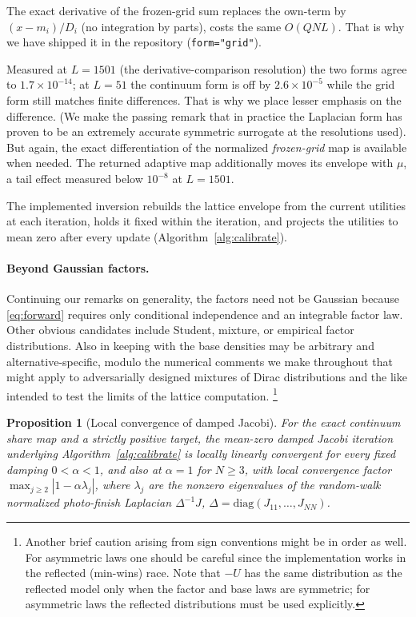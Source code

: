 \documentclass[12pt]{article}
\newtheorem{proposition}{Proposition}
\theoremstyle{remark}
\begin{document}
The exact derivative of the frozen-grid sum replaces the own-term by $(x - m_i)/D_i$ (no
integration by parts), costs the same $O(QNL)$. That is why we have shipped it in the repository
(\texttt{form="grid"}).

Measured at $L = 1501$ (the derivative-comparison resolution) the
two forms agree to $1.7\times10^{-14}$; at $L = 51$ the continuum form is
off by $2.6\times10^{-5}$ while the grid form still matches finite
differences. That is why we place lesser emphasis on the difference. (We make the passing remark
that in practice the Laplacian form has proven to be
 an extremely accurate symmetric surrogate at the
resolutions used). But again, the exact differentiation of the normalized
\emph{frozen-grid} map is available when needed.  The returned adaptive map
additionally moves its envelope with $\mu$, a tail effect measured below
$10^{-8}$ at $L = 1501$.

The implemented inversion rebuilds the lattice envelope from the current
utilities at each iteration, holds it fixed within the iteration, and
projects the utilities to mean zero after every update
(Algorithm~\ref{alg:calibrate}).

\paragraph{Beyond Gaussian factors.} Continuing our remarks on generality, the factors need not be Gaussian because \eqref{eq:forward} requires only
conditional independence and an integrable factor law. Other obvious candidates include Student, mixture,
or empirical factor distributions. Also in keeping with \citet{cotton2021} the base densities may be arbitrary and alternative-specific, modulo
the numerical comments we make throughout that might apply to adversarially designed mixtures of Dirac distributions and the like intended to test the 
limits of the lattice computation. \footnote{Another brief caution arising from sign conventions might be in order as well. For asymmetric laws one should be careful since 
the implementation works in the reflected (min-wins)
race. Note that $-U$ has the same distribution as the reflected model only when the
factor and base laws are symmetric; for asymmetric laws the reflected
distributions must be used explicitly.}

\begin{proposition}[Local convergence of damped Jacobi]
\label{prop:jacobi}
For the exact continuum share map and a strictly positive target, the
mean-zero damped Jacobi iteration underlying
Algorithm~\ref{alg:calibrate} is locally linearly convergent for every
fixed damping $0 < \alpha < 1$, and also at $\alpha = 1$ for $N \ge 3$,
with local convergence factor $\max_{j \ge 2} |1 - \alpha \lambda_j|$,
where $\lambda_j$ are the nonzero eigenvalues of the random-walk
normalized photo-finish Laplacian $\Delta^{-1} J$,
$\Delta = \mathrm{diag}(J_{11}, \dots, J_{NN})$.
\end{proposition}
\end{document}
